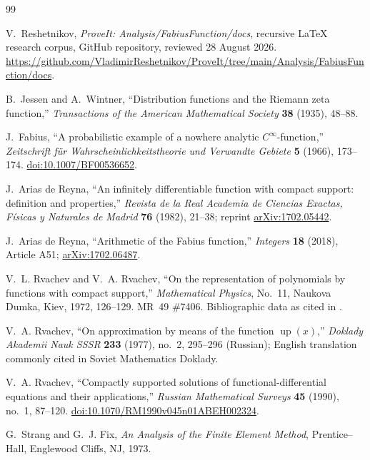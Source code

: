 \documentclass[11pt]{article}
\theoremstyle{definition}
\theoremstyle{remark}
\newcommand{\1}{\mathbf{1}}
\begin{document}
\begin{thebibliography}{99}

V.~Reshetnikov,
\emph{ProveIt: Analysis/FabiusFunction/docs}, recursive LaTeX research corpus,
GitHub repository, reviewed 28 August 2026.
\url{https://github.com/VladimirReshetnikov/ProveIt/tree/main/Analysis/FabiusFunction/docs}.

B.~Jessen and A.~Wintner,
``Distribution functions and the Riemann zeta function,''
\emph{Transactions of the American Mathematical Society} \textbf{38} (1935),
48--88.

J.~Fabius,
``A probabilistic example of a nowhere analytic $C^\infty$-function,''
\emph{Zeitschrift f\"ur Wahrscheinlichkeitstheorie und Verwandte Gebiete}
\textbf{5} (1966), 173--174.
\href{https://doi.org/10.1007/BF00536652}{doi:10.1007/BF00536652}.

J.~Arias de Reyna,
``An infinitely differentiable function with compact support: definition and
properties,''
\emph{Revista de la Real Academia de Ciencias Exactas, F\'isicas y Naturales de
Madrid} \textbf{76} (1982), 21--38; reprint
\href{https://arxiv.org/abs/1702.05442}{arXiv:1702.05442}.

J.~Arias de Reyna,
``Arithmetic of the Fabius function,''
\emph{Integers} \textbf{18} (2018), Article A51;
\href{https://arxiv.org/abs/1702.06487}{arXiv:1702.06487}.

V.~L. Rvachev and V.~A. Rvachev,
``On the representation of polynomials by functions with compact support,''
\emph{Mathematical Physics}, No.~11, Naukova Dumka, Kiev, 1972, 126--129.
MR~49 \#7406.  Bibliographic data as cited in \cite{Rvachev1990}.

V.~A. Rvachev,
``On approximation by means of the function $\operatorname{up}(x)$,''
\emph{Doklady Akademii Nauk SSSR} \textbf{233} (1977), no.~2, 295--296
(Russian); English translation commonly cited in Soviet Mathematics Doklady.

V.~A. Rvachev,
``Compactly supported solutions of functional-differential equations and their
applications,''
\emph{Russian Mathematical Surveys} \textbf{45} (1990), no.~1, 87--120.
\href{https://doi.org/10.1070/RM1990v045n01ABEH002324}{doi:10.1070/RM1990v045n01ABEH002324}.

G.~Strang and G.~J. Fix,
\emph{An Analysis of the Finite Element Method},
Prentice--Hall, Englewood Cliffs, NJ, 1973.


\end{thebibliography}
\end{document}
